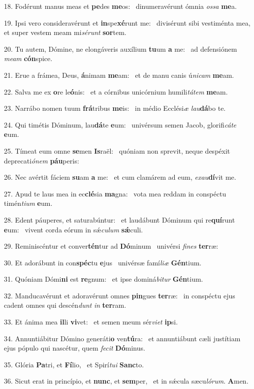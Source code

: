 18. Fodérunt manus meas et \textbf{pe}des \textbf{me}os: \ast\  dinumeravérunt ómnia \textit{os}\textit{sa} \textbf{me}a.\

19. Ipsi vero consideravérunt et \textbf{in}spe\textbf{xé}runt me: \ast\  divisérunt sibi vestiménta mea, et super vestem meam mi\textit{sé}\textit{runt} \textbf{sor}tem.\

20. Tu autem, Dómine, ne elongáveris auxílium \textbf{tu}um \textbf{a} me: \ast\  ad defensiónem \textit{me}\textit{am} \textbf{cón}spice.\

21. Erue a frámea, Deus, \textbf{á}nimam \textbf{me}am: \ast\  et de manu canis ú\textit{ni}\textit{cam} \textbf{me}am.\

22. Salva me ex \textbf{o}re le\textbf{ó}nis: \ast\  et a córnibus unicórnium humili\textit{tá}\textit{tem} \textbf{me}am.\

23. Narrábo nomen tuum \textbf{frá}tribus \textbf{me}is: \ast\  in médio Ecclési\textit{æ} \textit{lau}\textbf{dá}bo te.\

24. Qui timétis Dóminum, lau\textbf{dá}te \textbf{e}um: \ast\  univérsum semen Jacob, glorifi\textit{cá}\textit{te} \textbf{e}um.\

25. Tímeat eum omne \textbf{se}men \textbf{Is}raël: \ast\  quóniam non sprevit, neque despéxit deprecati\textit{ó}\textit{nem} \textbf{páu}peris:\

26. Nec avértit fáciem \textbf{su}am \textbf{a} me: \ast\  et cum clamárem ad eum, \textit{ex}\textit{au}\textbf{dí}vit me.\

27. Apud te laus mea in ec\textbf{clé}sia \textbf{ma}gna: \ast\  vota mea reddam in conspéctu timén\textit{ti}\textit{um} \textbf{e}um.\

28. Edent páuperes, et saturabúntur: \dag\  et laudábunt Dóminum qui re\textbf{quí}runt \textbf{e}um: \ast\  vivent corda eórum in sǽ\textit{cu}\textit{lum} \textbf{sǽ}culi.\

29. Reminiscéntur et conver\textbf{tén}tur ad \textbf{Dó}minum \ast\  univérsi \textit{fi}\textit{nes} \textbf{ter}ræ:\

30. Et adorábunt in con\textbf{spéc}tu \textbf{e}jus \ast\  univérsæ famí\textit{li}\textit{æ} \textbf{Gén}tium.\

31. Quóniam Dómi\textbf{ni} est \textbf{re}gnum: \ast\  et ipse dominá\textit{bi}\textit{tur} \textbf{Gén}tium.\

32. Manducavérunt et adoravérunt omnes \textbf{pin}gues \textbf{ter}ræ: \ast\  in conspéctu ejus cadent omnes qui descén\textit{dunt} \textit{in} \textbf{ter}ram.\

33. Et ánima mea \textbf{il}li \textbf{vi}vet: \ast\  et semen meum sér\textit{vi}\textit{et} \textbf{ip}si.\

34. Annuntiábitur Dómino generáti\textbf{o} ven\textbf{tú}ra: \ast\  et annuntiábunt cæli justítiam ejus pópulo qui nascétur, quem \textit{fe}\textit{cit} \textbf{Dó}minus.\

35. Glória \textbf{Pa}tri, et \textbf{Fí}lio, \ast\  et Spirí\textit{tu}\textit{i} \textbf{Sanc}to.\

36. Sicut erat in princípio, et \textbf{nunc}, et \textbf{sem}per, \ast\  et in sǽcula sæcu\textit{ló}\textit{rum}. \textbf{A}men.\

